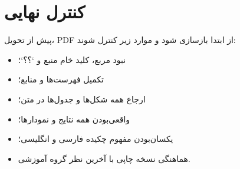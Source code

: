 \documentclass[12pt,a4paper]{article}
\begin{document}
\section{کنترل نهایی}
پیش از تحویل، PDF از ابتدا بازسازی شود و موارد زیر کنترل شوند:
\begin{itemize}
  \item نبود مربع، کلید خام منبع و `؟؟`؛
  \item تکمیل فهرست‌ها و منابع؛
  \item ارجاع همه شکل‌ها و جدول‌ها در متن؛
  \item واقعی‌بودن همه نتایج و نمودارها؛
  \item یکسان‌بودن مفهوم چکیده فارسی و انگلیسی؛
  \item هماهنگی نسخه چاپی با آخرین نظر گروه آموزشی.
\end{itemize}
\end{document}
